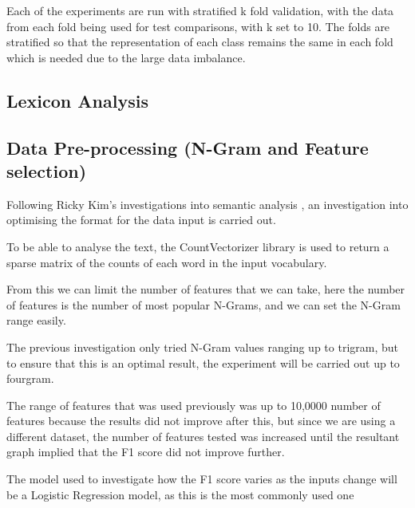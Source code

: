 Each of the experiments are run with stratified k fold validation, with the data from each fold being used for test comparisons, with k set to 10. The folds are stratified so that the representation of each class remains the same in each fold which is needed due to the large data imbalance. \cite{kohavi1995study}


\subsection{Lexicon Analysis}



\subsection{Data Pre-processing (N-Gram and Feature selection)}

Following Ricky Kim's investigations into semantic analysis \cite{towardsDS}, an investigation into optimising the format for the data input is carried out. 

To be able to analyse the text, the CountVectorizer library is used to return a sparse matrix of the counts of each word in the input vocabulary. 

From this we can limit the number of features that we can take, here the number of features is the number of most popular N-Grams, and we can set the N-Gram range easily. 

The previous investigation only tried N-Gram values ranging up to trigram, but to ensure that this is an optimal result, the experiment will be carried out up to fourgram.

The range of features that was used previously was up to 10,0000 number of features because the results did not improve after this, but since we are using a different dataset, the number of features tested was increased until the resultant graph implied that the F1 score did not improve further. 

The model used to investigate how the F1 score varies as the inputs change will be a Logistic Regression model, as this is the most commonly used one 

